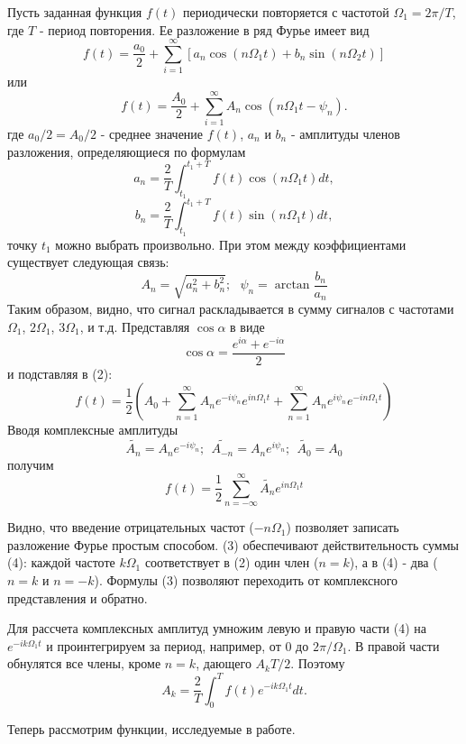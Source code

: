 \documentclass[14pt]{article}
\begin{document}
Пусть заданная функция $f(t)$ периодически повторяется с частотой $\Omega_1 = 2\pi/T$, где $T$ - период повторения. Ее разложение в ряд Фурье имеет вид
\begin{equation}
f(t) = \frac{a_0}{2} + \sum_{i = 1}^{\infty}[a_n\cos(n\Omega_1t) + b_n\sin(n\Omega_2t)]
\end{equation}
или
\begin{equation}
f(t) = \frac{A_0}{2} + \sum_{i = 1}^{\infty}A_n\cos(n\Omega_1t - \psi_n).
\end{equation}
\noindent где $a_0/2 = A_0/2$ - среднее значение $f(t)$, $a_n$ и $b_n$ - амплитуды членов разложения, определяющиеся по формулам
$$
	a_n = \frac{2}{T}\int_{t_1}^{t_1 + T}f(t)\cos(n\Omega_1t)dt,
$$
$$
	b_n = \frac{2}{T}\int_{t_1}^{t_1 + T}f(t)\sin(n\Omega_1t)dt,
$$
\noindent точку $t_1$ можно выбрать произвольно. При этом между коэффициентами существует следующая связь:
$$
	A_n = \sqrt{a_n^2 + b_n^2};~~~\psi_n = \arctan\frac{b_n}{a_n}
$$
\noindent Таким образом, видно, что сигнал раскладывается в сумму сигналов с частотами $\Omega_1$, $2\Omega_1$, $3\Omega_1$, и т.д. Представляя $\cos\alpha$ в виде
$$
	\cos\alpha = \frac{e^{i\alpha} + e^{-i\alpha}}{2}
$$
\noindent и подставляя в (2):
$$
	f(t) = \frac{1}{2}\left(A_0 + \sum_{n = 1}^{\infty}A_ne^{-i\psi_n}e^{in\Omega_1t} + \sum_{n = 1}^{\infty}A_ne^{i\psi_n}e^{-in\Omega_1t}\right)
$$
\noindent Вводя комплексные амплитуды
\begin{equation}
\widetilde{A_n} = A_ne^{-i\psi_n};~~\widetilde{A_{-n}} = A_ne^{i\psi_n};~~\widetilde{A_0} = A_0
\end{equation}
\noindent получим
\begin{equation}
f(t) = \frac{1}{2}\sum_{n = -\infty}^{\infty}\widetilde{A_n}e^{in\Omega_1t}
\end{equation}

 
Видно, что введение отрицательных частот ($-n\Omega_1$) позволяет записать разложение Фурье простым способом. (3) обеспечивают действительность суммы (4): каждой частоте 
$k\Omega_1$ соответствует в (2) один член ($n = k$), а в (4) - два ($n = k$ и $n = -k$). Формулы (3) позволяют переходить от комплексного представления и обратно. 

Для рассчета комплексных амплитуд умножим левую и правую части (4) на $e^{-ik\Omega_1t}$ и проинтегрируем за период, например, от 0 до $2\pi/\Omega_1$. В правой части обнулятся все члены, кроме $n = k$, дающего $A_kT/2$. Поэтому
$$
	A_k = \frac{2}{T}\int_0^Tf(t)e^{-ik\Omega_1t}dt.
$$

Теперь рассмотрим функции, исследуемые в работе.
\end{document}
